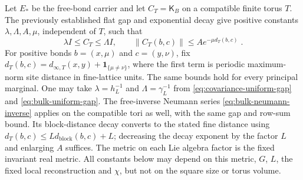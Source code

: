 \documentclass[11pt]{article}
\begin{document}
Let $E_*$ be the free-bond carrier and let $C_T=\mathsf K_B$ on a compatible finite torus $T$. The previously established flat gap and exponential decay give positive constants $\lambda,\Lambda,A,\mu$, independent of $T$, such that
\begin{equation}\label{eq:marginal-covariance-input}
    \lambda I\leq C_T\leq \Lambda I,
    \qquad \|C_T(b,c)\|\leq A e^{-\mu d_T(b,c)}\;.
\end{equation}
For positive bonds $b=(x,\mu)$ and $c=(y,\nu)$, fix $d_T(b,c)=d_{\infty,T}(x,y)+\mathbf1_{\{\mu\ne \nu\}}$, where the first term is periodic maximum-norm site distance in fine-lattice units. The same bounds hold for every principal marginal. One may take $\lambda=h_L^{-1}$ and $\Lambda=\gamma_L^{-1}$ from \eqref{eq:covariance-uniform-gap} and \eqref{eq:bulk-uniform-gap}. The free-inverse Neumann series \eqref{eq:bulk-neumann-inverse} applies on the compatible tori as well, with the same gap and row-sum bound. Its block-distance decay converts to the stated fine distance using $d_T(b,c)\leq Ld_{\mathrm{block}}(b,c)+L$; decreasing the decay exponent by the factor $L$ and enlarging $A$ suffices. The metric on each Lie algebra factor is the fixed invariant real metric. All constants below may depend on this metric, $G$, $L$, the fixed local reconstruction and $\chi$, but not on the square size or torus volume.
\end{document}
